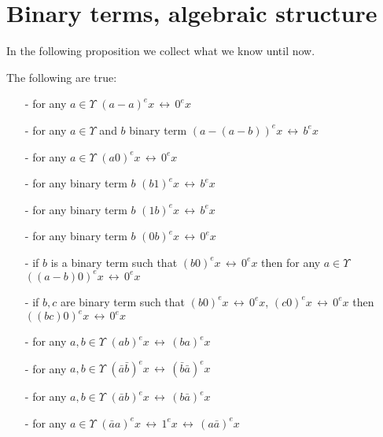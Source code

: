 \section{Binary terms, algebraic structure}

In the following proposition we collect what we know until now. 

\begin{proposition}
The following are true: 
\begin{enumerate}
\item[-] for any $a \in \Upsilon$  $\displaystyle (a - a)^{e} x \, \longleftrightarrow \, 0^{e} x$
\item[-] for any $a \in \Upsilon$ and $b$ binary term $\displaystyle \left(a - \left(a - b\right)\right)^{e} x \, \longleftrightarrow \, b^{e} x$
\item[-] for any $a \in \Upsilon$  $\displaystyle \left(a 0 \right)^{e} x \, \longleftrightarrow \, 0^{e} x$
\item[-] for any binary term $b$  $\displaystyle \left(b 1 \right)^{e} x \, \longleftrightarrow \, b^{e} x$
\item[-] for any binary term $b$  $\displaystyle \left(1 b \right)^{e} x \, \longleftrightarrow \, b^{e} x$
\item[-] for any binary term $b$  $\displaystyle \left(0 b \right)^{e} x \, \longleftrightarrow \, 0^{e} x$
\item[-] if $b$ is a binary term such that $\displaystyle  \left(b 0 \right)^{e} x \, \longleftrightarrow \, 0^{e} x$ then for any $a \in \Upsilon$ $\displaystyle \left(\left(a-b\right) 0 \right)^{e} x \, \longleftrightarrow \, 0^{e} x$
\item[-] if $b, c$ are binary term such that $\displaystyle  \left(b 0 \right)^{e} x \, \longleftrightarrow \, 0^{e} x$,  $\displaystyle  \left(c 0 \right)^{e} x \, \longleftrightarrow \, 0^{e} x$ then $\displaystyle  \left(\left(b c\right) 0 \right)^{e} x \, \longleftrightarrow \, 0^{e} x$ 
\item[-] for any $a,b \in \Upsilon$ $\displaystyle \left(a b \right)^{e} x \, \longleftrightarrow \, \left(b a  \right)^{e} x$
\item[-] for any $a,b \in \Upsilon$ $\displaystyle \left(\bar{a} \bar{b} \right)^{e} x \, \longleftrightarrow \, \left(\bar{b} \bar{a}  \right)^{e} x$
\item[-] for any $a,b \in \Upsilon$ $\displaystyle \left(\bar{a} b \right)^{e} x \, \longleftrightarrow \, \left(b \bar{a}  \right)^{e} x$
\item[-] for any $a \in \Upsilon$ $\displaystyle \left(\bar{a} a \right)^{e} x \, \longleftrightarrow \, 1^{e} x  \, \longleftrightarrow \, \left(a \bar{a}  \right)^{e} x$
\end{enumerate}

\end{proposition}

